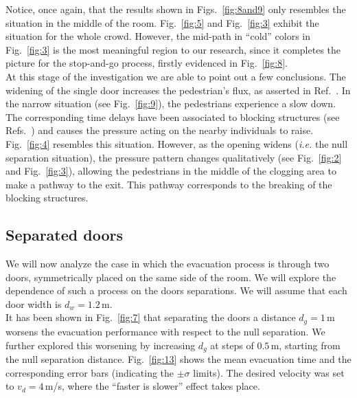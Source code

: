 

Notice, once again, that the results shown in Figs.~\ref{fig:8and9} only resembles the 
situation in the middle of the room. Fig.~\ref{fig:5} and Fig.~\ref{fig:3} exhibit 
the situation for the whole crowd. However, the mid-path in ``cold'' colors in Fig.~\ref{fig:3} is
the most meaningful region to our research, since it completes the picture
for the stop-and-go process, firstly evidenced in Fig.~\ref{fig:8}.
\\



At this stage of the investigation we are able to point out a few conclusions. 
The widening of the single door increases the pedestrian's flux, as asserted in 
Ref.~\cite{daoliang1}. In the narrow situation (see Fig.~\ref{fig:9}), 
the pedestrians experience a slow down. The corresponding time delays have been 
associated to blocking structures (see Refs.~\cite{Dorso1,Dorso2}) and causes 
the pressure acting on the nearby individuals to raise. Fig.~\ref{fig:4} 
resembles this situation. However, as the opening widens (\emph{i.e.} the null 
separation situation), the pressure pattern changes qualitatively (see 
Fig.~\ref{fig:2} and Fig.~\ref{fig:3}), allowing the pedestrians in the middle 
of the clogging area to make a pathway to the exit. This pathway corresponds to 
the breaking of the blocking structures.   \\

\subsection{\label{door_seperation} Separated doors}

We will now analyze the case in which the evacuation process is through two 
doors, symmetrically placed on the same side of the room. We will explore the 
dependence of such a process on the doors separations. We will assume that 
each door width is $d_w=1.2\,$m.  \\

It has been shown in Fig.~\ref{fig:7} that separating the doors a distance 
$d_g=1\,$m worsens the evacuation performance with respect to the null 
separation. We  further explored this worsening by increasing $d_g$ at steps of 
$0.5\,$m, starting from the null separation distance. Fig.~\ref{fig:13} shows 
the mean evacuation time and the corresponding error bars (indicating the 
$\pm\sigma$ limits). The desired velocity was set to $v_d=4\,$m/s, where the 
``faster is slower'' effect takes place. \\

